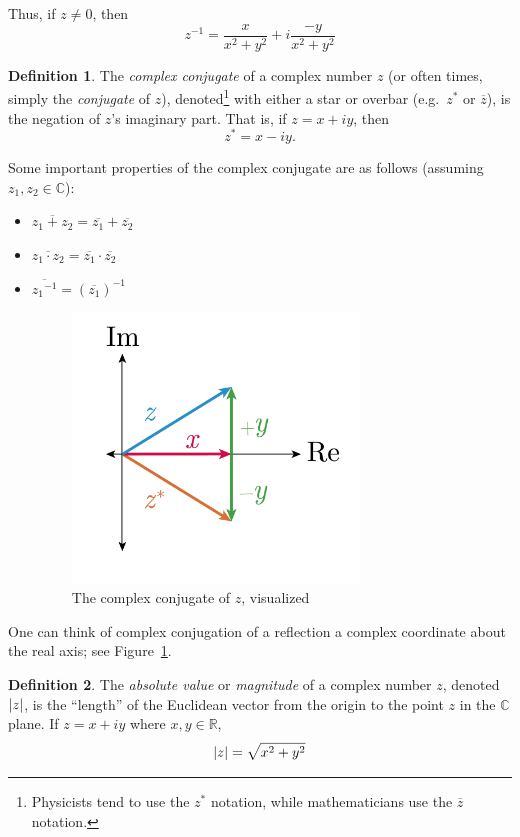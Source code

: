 \documentclass[10pt]{scrartcl}
\numberwithin{equation}{subsection}
\theoremstyle{definition}
\newtheorem{definition}{Definition}[section]
\theoremstyle{remark}
\newenvironment{definitionSR}
{
\begin{siderules}
\begin{definition}
}
{
\end{definition}
\end{siderules}
}
\newcommand{\Reals}{\mathbb{R}}
\newcommand{\Complex}{\mathbb{C}}
\newcommand{\inv}[1]{
	{#1}^{-1}
}
\newcommand*{\conjugate}[1]{\overline{#1}}
\newcommand*{\conj}[1]{{#1}^*}
\begin{document}
Thus, if $z \neq 0$, then
\[
\inv{z} = \frac{x}{x^2+y^2} + i \frac{-y}{x^2+y^2}
\]
\begin{definitionSR}
The \textit{complex conjugate} of a complex number $z$
(or often times, simply the \textit{conjugate} of $z$),
denoted\footnote{Physicists tend to use the $\conj{z}$ notation,
while mathematicians use the $\conjugate{z}$ notation.}
with either a star or overbar (e.g.\ $\conj{z}$ or $\conjugate{z}$),
is the negation of $z$'s imaginary part. That is, if $z = x+iy$, then
\[
\conj{z} = x-iy.
\]

\end{definitionSR}
Some important properties of the complex conjugate are as follows
(assuming $z_1, z_2 \in \Complex$):
\begin{itemize}
\item $\conjugate{z_1+z_2} = \conjugate{z_1} + \conjugate{z_2}$
\item $\conjugate{z_1 \cdot  z_2} = \conjugate{z_1} \cdot \conjugate{z_2}$
\item $\conjugate{\inv{z_1}} = \inv{(\conjugate{z_1})}$

\begin{figure}[h]
	\centering
	\caption{The complex conjugate of $z$, visualized}
	\label{fig:conjugate}
	\includegraphics[width=3in]{complex_number_diagram-03}
\end{figure}
\end{itemize}
One can think of complex conjugation of a reflection a complex coordinate about the real axis;
see Figure~\ref{fig:conjugate}.

\begin{definitionSR}
The \textit{absolute value} or \textit{magnitude} of a 
complex number $z$, denoted $\abs{z}$, is the ``length'' of the Euclidean vector from the origin 
to the point $z$ in the $\Complex$ plane. If $z=x+iy$ where $x,y \in \Reals$,
\[
\abs{z} = \sqrt{x^2 + y^2}
\]
\end{definitionSR}
\end{document}
